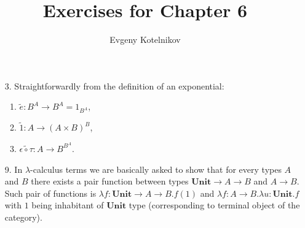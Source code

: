 \documentclass[12pt]{article}
\author{Evgeny Kotelnikov}
\title{Exercises for Chapter 6}
\date{}
\theoremstyle{definition}
\begin{document}
\maketitle

\begin{enumerate}
  \item[3.]
    Straightforwardly from the definition of an exponential:
    \begin{enumerate}
      \item $\tilde{e} : B^A \to B^A = 1_{B^A}$,
      \item $\tilde{1} : A \to (A \times B)^B$,
      \item $\tilde{\epsilon \circ \tau} : A \to B^{B^A}$.
    \end{enumerate}

  \item[9.]
    In $\lambda$-calculus terms we are basically asked to show that for every types $A$ and $B$ there exists a pair function between types $\mathbf{Unit} \to A \to B $ and $A \to B$. Such pair of functions is $\lambda f : \mathbf{Unit} \to A \to B. f(1)$ and $\lambda f : A \to B. \lambda u : \mathbf{Unit}. f$ with $1$ being inhabitant of $\mathbf{Unit}$ type (corresponding to terminal object of the category).

\end{enumerate}
\end{document}
